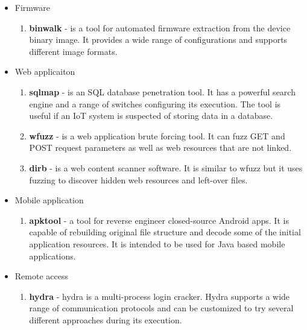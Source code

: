 	\begin{itemize}
	
		\item Firmware
		\begin{enumerate}
			\item \textbf{binwalk} - is a tool for automated firmware extraction from the device binary image. It provides a wide range of configurations and supports different image formats.
		\end{enumerate}
		
		
		\item Web applicaiton
		\begin{enumerate}[resume]
			\item \textbf{sqlmap} - is an SQL database penetration tool. It has a powerful search engine and a range of switches configuring its execution. The tool is useful if an IoT system is suspected of storing data in a database.
			\item \textbf{wfuzz} - is a web application brute forcing tool. It can fuzz GET and POST request parameters as well as web resources that are not linked.
			\item \textbf{dirb} - is a web content scanner software. It is similar to wfuzz but it uses fuzzing to discover hidden web resources and left-over files. 
		\end{enumerate}
		
		\item Mobile application
		\begin{enumerate}[resume]
			\item \textbf{apktool} - a tool for reverse engineer closed-source Android apps. It is capable of rebuilding original file structure and decode some of the initial application resources. It is intended to be used for Java based mobile applications.
		\end{enumerate}
		
		\item Remote access
		\begin{enumerate}[resume]
			\item \textbf{hydra} - hydra is a multi-process login cracker. Hydra supports a wide range of communication protocols and can be customized to try several different approaches during its execution.
		\end{enumerate}
		

\end{itemize}
